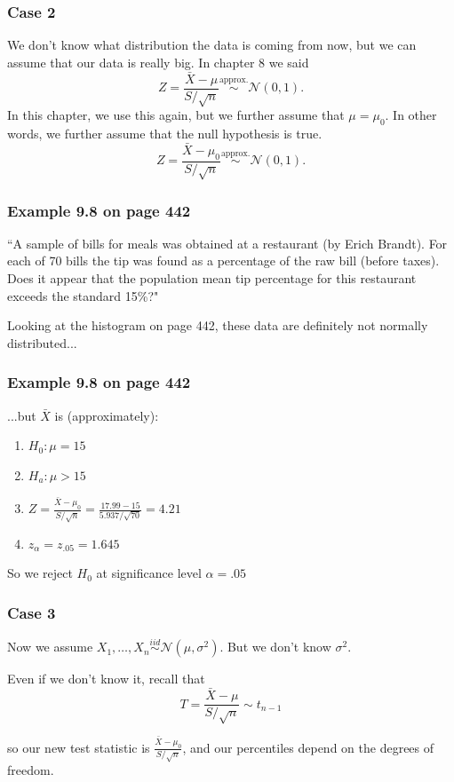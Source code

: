 \documentclass{beamer}
\begin{document}
\begin{frame}
\frametitle{Case 2}

We don't know what distribution the data is coming from now, but we can assume that our data is really big. In chapter 8 we said 
\[
Z = \frac{\bar{X} - \mu}{S /\sqrt{n}} \overset{\text{approx.}}{\sim} \mathcal{N}(0,1).
\]
In this chapter, we use this again, but we further assume that $\mu = \mu_0$. In other words, we further assume that the null hypothesis is true. 
\[
Z = \frac{\bar{X} - \mu_0}{S /\sqrt{n}} \overset{\text{approx.}}{\sim} \mathcal{N}(0,1).
\]

\end{frame}


\begin{frame}
\frametitle{Example 9.8 on page 442}

``A sample of bills for meals was obtained at a restaurant (by Erich Brandt). For each of 70 bills the tip was found as a percentage of the raw bill (before taxes). Does it appear that the population mean tip percentage for this restaurant exceeds the standard 15\%?"
\newline

Looking at the histogram on page 442, these data are definitely not normally distributed...
\end{frame}


\begin{frame}
\frametitle{Example 9.8 on page 442}

...but $\bar{X}$ is (approximately):

\begin{enumerate}
\item $H_0: \mu = 15$
\item $H_a: \mu > 15$
\item $Z = \frac{\bar{X} - \mu_0}{S / \sqrt{n}} = \frac{17.99 - 15}{5.937 / \sqrt{70}} = 4.21$
\item $z_{\alpha} = z_{.05} = 1.645$
\end{enumerate}

So we reject $H_0$ at significance level $\alpha = .05$
\end{frame}

\begin{frame}
\frametitle{Case 3}

Now we assume $X_1, \ldots, X_n \overset{iid}{\sim} \mathcal{N}(\mu, \sigma^2)$. But we don't know $\sigma^2$. 
\newline

Even if we don't know it, recall that 
\[
T = \frac{\bar{X} - \mu}{S/\sqrt{n}} \sim t_{n-1}
\]

so our new test statistic is $\frac{\bar{X} - \mu_0}{S/\sqrt{n}}$, and our percentiles depend on the degrees of freedom.

\end{frame}
\end{document}
